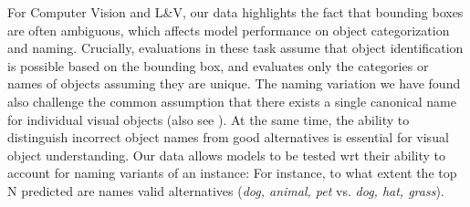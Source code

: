 For Computer Vision and L\&V, our data highlights the fact that bounding boxes are often ambiguous, which affects model performance on object categorization and naming.
Crucially, evaluations in these task assume that object identification is possible based on the bounding box, and evaluates only the categories or names of objects assuming they are unique.
The naming variation we have found also challenge the common assumption that there exists a single canonical name for individual visual objects (also see \cite{deng2014large,wang2014poodle,peterson2018learning}).
At the same time, the ability to distinguish incorrect object names from good alternatives is essential for visual object understanding.
Our data allows models to be tested wrt their ability to account for naming variants of an instance: For instance, to what extent the top N predicted are names valid alternatives (\textsl{dog, animal, pet} vs. \textsl{dog, hat, grass}). 


